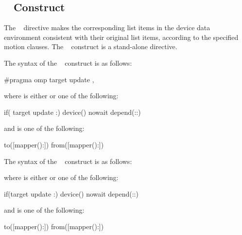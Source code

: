 \subsection{~ Construct}
\label{subsec:target update Construct}
\summary
The ~ directive makes the corresponding list items in the device data
environment consistent with their original list items, according to the specified motion
clauses. The ~ construct is a stand-alone directive.

\syntax
\begin{ccppspecific}
The syntax of the ~ construct is as follows:

\begin{ompcPragma}
#pragma omp target update \plc{clause[ [ [},\plc{] clause] ... ] new-line}
\end{ompcPragma}
where  is either  or one of the following:

\begin{indentedcodelist}
if(\plc{[} target update :\plc{] scalar-expression})
device()
nowait
depend(\plc{[depend-modifier}:\plc{]dependence-type }:)
\end{indentedcodelist}

and  is one of the following:

\begin{indentedcodelist}
to([mapper():])
from([mapper():])
\end{indentedcodelist}
\end{ccppspecific}

\begin{fortranspecific}
The syntax of the ~ construct is as follows:


where  is either  or one of the following:

\begin{indentedcodelist}
if(\plc{[}target update :\plc{] scalar-logical-expression})
device()
nowait
depend(\plc{[depend-modifier}:\plc{]dependence-type }:)
\end{indentedcodelist}

and  is one of the following:

\begin{indentedcodelist}
to([mapper():])
from([mapper():])
\end{indentedcodelist}
\end{fortranspecific}


